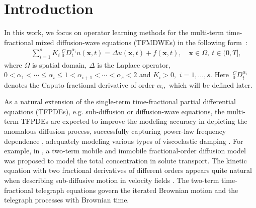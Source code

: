 \documentclass[11pt]{article}
\begin{document}
\section{Introduction}

In this work, we focus on  operator learning methods for the multi-term time-fractional mixed diffusion-wave equations (TFMDWEs) in the following form~\cite{hao2016finite}:
\begin{eqnarray}\label{multi-dw}
&&\sum_{i=1}^sK_i\  _0^{C}D_t^{\alpha_i}u(\mathbf{x},t)= \Delta u(\mathbf{x},t) +f(\mathbf{x},t),\quad \mathbf{x}\in \Omega,~t\in (0, T],
\end{eqnarray}
where $\Omega$ is spatial domain, $\Delta$ is the Laplace operator,  $0< \alpha_1<\cdots \leq  \alpha_{i}\leq 1<\alpha_{i+1}< \cdots <\alpha_s <2 $ and $K_i>0,$ $i=1,\ldots,s.$ Here $ \  _0^{C}D_t^{\alpha_i}$ denotes the Caputo fractional derivative of order $\alpha_i,$ which will be defined later.


  As a natural extension of the single-term time-fractional partial differential equations (TFPDEs), e.g. sub-diffusion or diffusion-wave equations, the multi-term TFPDEs are expected to improve the modeling accuracy in depicting the anomalous diffusion process, successfully capturing power-law frequency dependence \cite{Kelly2008}, adequately modeling various types of viscoelastic damping \cite{Chen-Liu2012}. For example, in \cite{Schumer-Benson2003},  a two-term  mobile and immobile fractional-order diffusion model was proposed to model the total concentration in solute transport. The kinetic equation with two fractional derivatives of different orders appears quite natural when describing sub-diffusive motion in velocity fields \cite{Metzler1998}. The two-term time-fractional telegraph equations \cite{Orsingher2004} govern the iterated Brownian motion and the telegraph processes with Brownian
time.
\end{document}
